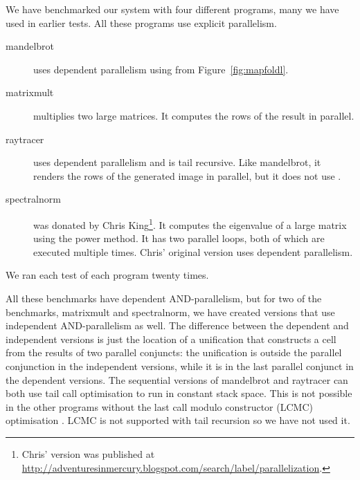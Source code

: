 We have benchmarked our system with four different programs,
many we have used in earlier tests.
All these programs use explicit parallelism.
\begin{description}
\item[mandelbrot] uses dependent parallelism using \mapfoldl from
Figure~\ref{fig:mapfoldl}.

\item[matrixmult]
multiplies two large matrices.
It computes the rows of the result in parallel.

\item[raytracer] uses dependent parallelism and is tail recursive.
Like mandelbrot, it renders the rows of the generated image in parallel,
but it does not use \mapfoldl{}.

\item[spectralnorm]
was donated by Chris King\footnote{Chris' version was published at
\url{http://adventuresinmercury.blogspot.com/search/label/parallelization}.}.
It computes the eigenvalue of a large matrix using the power method.
It has two parallel loops, both of which are executed multiple times.
Chris' original version uses dependent parallelism.
\end{description}

We ran each test of each program twenty times.

\noindent
All these benchmarks have dependent AND-parallelism,
but for two of the benchmarks, matrixmult and spectralnorm,
we have created versions that use independent AND-parallelism as well.
The difference between the dependent and independent versions
is just the location of a unification that constructs a cell
from the results of two parallel conjuncts:
the unification is outside the parallel conjunction in the independent versions,
while it is in the last parallel conjunct in the dependent versions.
The sequential versions of mandelbrot and raytracer can both use tail call
optimisation to run in constant stack space.
This is not possible in the other programs without
the last call modulo constructor (LCMC)
optimisation \citep{ross:mercury-lcmc}.
LCMC is not supported with tail recursion so we have not used it.



